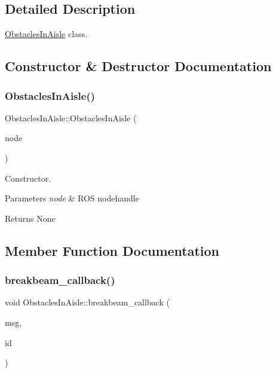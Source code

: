 \subsection{Detailed Description}
\hyperlink{classObstaclesInAisle}{Obstacles\+In\+Aisle} class. 

\subsection{Constructor \& Destructor Documentation}
\mbox{\label{classObstaclesInAisle_a4d20a41862867ff7cdba73fad954cdb1}} 
\subsubsection{\texorpdfstring{Obstacles\+In\+Aisle()}{ObstaclesInAisle()}}
{\footnotesize\ttfamily Obstacles\+In\+Aisle\+::\+Obstacles\+In\+Aisle (\begin{DoxyParamCaption}\item[{ros\+::\+Node\+Handle \&}]{node }\end{DoxyParamCaption})}



Constructor. 


\begin{DoxyParams}{Parameters}
{\em node} & R\+OS nodehandle \\
\hline
\end{DoxyParams}
\begin{DoxyReturn}{Returns}
None 
\end{DoxyReturn}


\subsection{Member Function Documentation}
\mbox{\label{classObstaclesInAisle_a62fe52625ce87d35a55f5c790ba45bb9}} 
\subsubsection{\texorpdfstring{breakbeam\+\_\+callback()}{breakbeam\_callback()}}
{\footnotesize\ttfamily void Obstacles\+In\+Aisle\+::breakbeam\+\_\+callback (\begin{DoxyParamCaption}\item[{const nist\+\_\+gear\+::\+Proximity\+::\+Const\+Ptr \&}]{msg,  }\item[{int}]{id }\end{DoxyParamCaption})}



